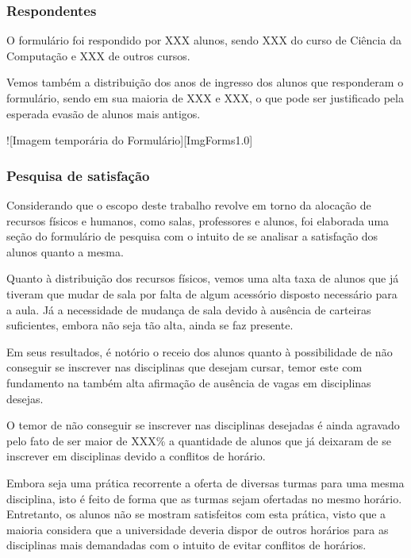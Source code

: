    \subsubsection{Respondentes} %

        O formulário foi respondido por XXX alunos, sendo XXX do curso de Ciência da Computação e XXX de outros cursos.

        Vemos também a distribuição dos anos de ingresso dos alunos que responderam o formulário, sendo em sua maioria de XXX e XXX, o que pode ser justificado pela esperada evasão de alunos mais antigos.

        ![Imagem temporária do Formulário][ImgForms1.0]

    \subsubsection{Pesquisa de satisfação} %

        Considerando que o escopo deste trabalho revolve em torno da alocação de recursos físicos e humanos, como salas, professores e alunos, foi elaborada uma seção do formulário de pesquisa com o intuito de se analisar a satisfação dos alunos quanto a mesma.

        Quanto à distribuição dos recursos físicos, vemos uma alta taxa de alunos que já tiveram que mudar de sala por falta de algum acessório disposto necessário para a aula. Já a necessidade de mudança de sala devido à ausência de carteiras suficientes, embora não seja tão alta, ainda se faz presente.

        Em seus resultados, é notório o receio dos alunos quanto à possibilidade de não conseguir se inscrever nas disciplinas que desejam cursar, temor este com fundamento na também alta afirmação de ausência de vagas em disciplinas desejas.

        O temor de não conseguir se inscrever nas disciplinas desejadas é ainda agravado pelo fato de ser maior de XXX\% a quantidade de alunos que já deixaram de se inscrever em disciplinas devido a conflitos de horário.

        Embora seja uma prática recorrente a oferta de diversas turmas para uma mesma disciplina, isto é feito de forma que as turmas sejam ofertadas no mesmo horário. Entretanto, os alunos não se mostram satisfeitos com esta prática, visto que a maioria considera que a universidade deveria dispor de outros horários para as disciplinas mais demandadas com o intuito de evitar conflitos de horários.


